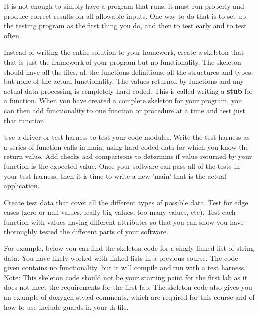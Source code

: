  It is not enough to simply have a program that runs,   it must run properly and produce correct results for all allowable inputs.  One way to do that is to set up the testing program as the first thing you do, and then to test early and to test often.   
 
 Instead of writing the entire solution to your homework, create a skeleton that that is just the framework of your program but no functionality.  The skeleton should have all the files, all the functions  definitions,  all the structures and types, but none of the actual functionality.  The values returned by functions and any actual data processing is completely hard coded.    This is called writing a \textbf{stub} for a function.  
When you have created a complete skeleton for your program, you can then add functionality to one function or procedure at a time and test just that function.
 
Use a driver or test harness to test your code modules.  Write the test harness as a series of function calls in main, using hard coded data for which you know the return value.  Add checks and comparisons to determine if value returned by your function is the expected value.  Once your software can pass all of the tests in your test harness, then it is time to write a new 'main' that is the actual application.
 
Create test data that cover all the different types of possible data.   Test for edge cases (zero or null values,   really big values, too many values, etc).   Test each function with  values having different attributes so that you can show you have thoroughly tested the different parts of your software.

For example,  below you can find  the skeleton code for a singly linked list of string data.  You have likely worked with linked lists in a previous course.  The code given contains no functionality, but it will compile and run with a test harness.    Note:  This skeleton code should not be your starting point for the first lab as it does not meet the requirements for the first lab.   The skeleton code also gives you an example of doxygen-styled comments, which are required for this course and of how to use include guards in your .h file.


